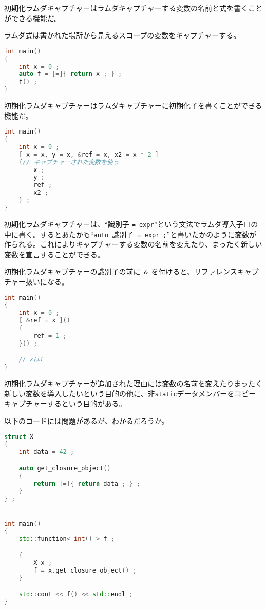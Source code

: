 %

初期化ラムダキャプチャーはラムダキャプチャーする変数の名前と式を書くことができる機能だ。

ラムダ式は書かれた場所から見えるスコープの変数をキャプチャーする。

\begin{lstlisting}[language=C++]
int main()
{
    int x = 0 ;
    auto f = [=]{ return x ; } ;
    f() ;
}
\end{lstlisting}

初期化ラムダキャプチャーはラムダキャプチャーに初期化子を書くことができる機能だ。

\begin{lstlisting}[language=C++]
int main()
{
    int x = 0 ;
    [ x = x, y = x, &ref = x, x2 = x * 2 ]
    {// キャプチャーされた変数を使う
        x ;
        y ;
        ref ;
        x2 ;
    } ;
}
\end{lstlisting}

初期化ラムダキャプチャーは、``識別子 \lstinline!= expr!''という文法でラムダ導入子\lstinline![]!の中に書く。するとあたかも``\lstinline!auto!~識別子~\lstinline!= expr ;!''と書いたかのように変数が作られる。これによりキャプチャーする変数の名前を変えたり、まったく新しい変数を宣言することができる。

初期化ラムダキャプチャーの識別子の前に~\lstinline!&!~を付けると、リファレンスキャプチャー扱いになる。

\begin{lstlisting}[language=C++]
int main()
{
    int x = 0 ;
    [ &ref = x ]()
    {
        ref = 1 ;
    }() ;

    // xは1
}
\end{lstlisting}

初期化ラムダキャプチャーが追加された理由には変数の名前を変えたりまったく新しい変数を導入したいという目的の他に、非\lstinline!static!データメンバーをコピーキャプチャーするという目的がある。

以下のコードには問題があるが、わかるだろうか。

\begin{lstlisting}[language=C++]
struct X
{
    int data = 42 ;

    auto get_closure_object()
    {
        return [=]{ return data ; } ;
    }
} ;


int main()
{
    std::function< int() > f ;

    {
        X x ;
        f = x.get_closure_object() ;
    }

    std::cout << f() << std::endl ;
}
\end{lstlisting}

